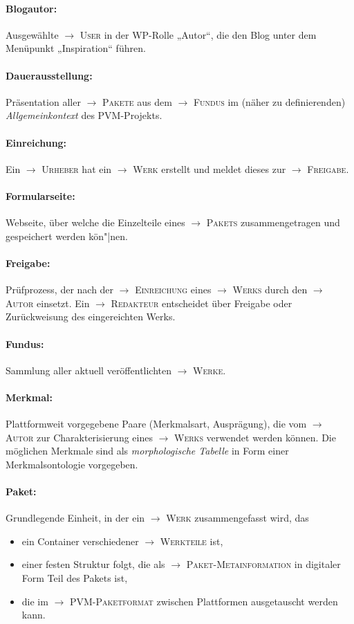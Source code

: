 \documentclass[a4paper,11pt]{article}
\newcommand{\glossar}[1]{{$\to$ \textsc{#1}}}
\begin{document}
\paragraph{Blogautor:} 
Ausgewählte \glossar{User} in der WP-Rolle „Autor“, die den Blog unter dem
Menüpunkt „Inspiration“ führen. 

\paragraph{Dauerausstellung:} 
Präsentation aller \glossar{Pakete} aus dem \glossar{Fundus} im (näher zu
definierenden) \emph{Allgemeinkontext} des PVM-Projekts.

\paragraph{Einreichung:} 
Ein \glossar{Urheber} hat ein \glossar{Werk} erstellt und meldet dieses zur
\glossar{Freigabe}.

\paragraph{Formularseite:} 
Webseite, über welche die Einzelteile eines \glossar{Pakets} zusammengetragen
und gespeichert werden kön"|nen.  

\paragraph{Freigabe:} 
Prüfprozess, der nach der \glossar{Einreichung} eines \glossar{Werks} durch den
\glossar{Autor} einsetzt. Ein \glossar{Redakteur} entscheidet über Freigabe
oder Zurückweisung des eingereichten {Werks}.

\paragraph{Fundus:} 
Sammlung aller aktuell veröffentlichten \glossar{Werke}. 

\paragraph{Merkmal:} 
Plattformweit vorgegebene Paare (Merkmalsart, Ausprägung), die vom
\glossar{Autor} zur Charakterisierung eines \glossar{Werks} verwendet werden
können.  Die möglichen Merkmale sind als \emph{morphologische Tabelle} in Form
einer Merkmalsontologie vorgegeben.

\paragraph{Paket:} 
Grundlegende Einheit, in der ein \glossar{Werk} zusammengefasst wird, das 
\begin{itemize}\itemsep0pt
\item ein Container verschiedener \glossar{Werkteile} ist,
\item einer festen Struktur folgt, die als \glossar{Paket-Metainformation} in
  digitaler Form Teil des Pakets ist,  
\item die im \glossar{PVM-Paketformat} zwischen Plattformen ausgetauscht werden
  kann.
\end{itemize}
\end{document}
